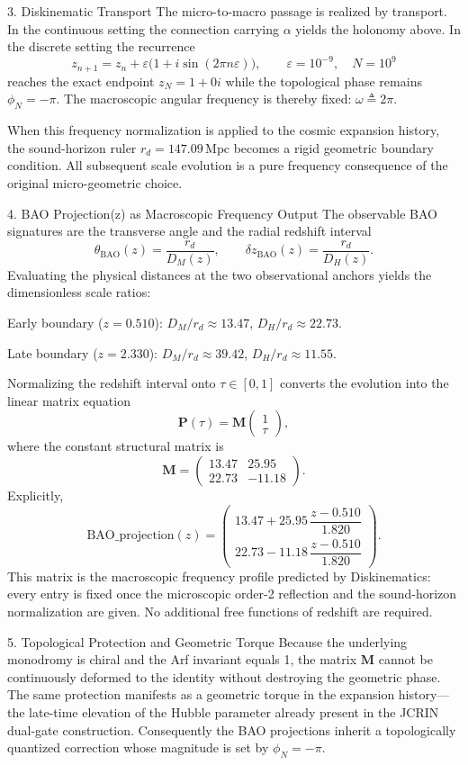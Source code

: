 3. Diskinematic Transport
The micro-to-macro passage is realized by transport. In the continuous setting the connection carrying \(\alpha\) yields the holonomy above. In the discrete setting the recurrence  
\[
z_{n+1}=z_n+\varepsilon\bigl(1+i\sin(2\pi n\varepsilon)\bigr),\qquad\varepsilon=10^{-9},\quad N=10^9
\]  
reaches the exact endpoint \(z_N=1+0i\) while the topological phase remains \(\phi_N=-\pi\). The macroscopic angular frequency is thereby fixed: \(\omega\triangleq2\pi\).

When this frequency normalization is applied to the cosmic expansion history, the sound-horizon ruler \(r_d=147.09\,\mathrm{Mpc}\) becomes a rigid geometric boundary condition. All subsequent scale evolution is a pure frequency consequence of the original micro-geometric choice.

4. BAO Projection(z) as Macroscopic Frequency Output
The observable BAO signatures are the transverse angle and the radial redshift interval  
\[
\theta_{\mathrm{BAO}}(z)=\frac{r_d}{D_M(z)},\qquad\delta z_{\mathrm{BAO}}(z)=\frac{r_d}{D_H(z)}.
\]  
Evaluating the physical distances at the two observational anchors yields the dimensionless scale ratios:

Early boundary (\(z=0.510\)):  
  \(D_M/r_d\approx13.47\), \(D_H/r_d\approx22.73\).

Late boundary (\(z=2.330\)):  
  \(D_M/r_d\approx39.42\), \(D_H/r_d\approx11.55\).

Normalizing the redshift interval onto \(\tau\in[0,1]\) converts the evolution into the linear matrix equation  
\[
\mathbf{P}(\tau)=\mathbf{M}\begin{pmatrix}1\\\tau\end{pmatrix},
\]  
where the constant structural matrix is  
\[
\mathbf{M}=\begin{pmatrix}13.47&25.95\\22.73&-11.18\end{pmatrix}.
\]  
Explicitly,  
\[
\mathrm{BAO\_projection}(z)=\begin{pmatrix}
13.47+25.95\,\dfrac{z-0.510}{1.820}\\
22.73-11.18\,\dfrac{z-0.510}{1.820}
\end{pmatrix}.
\]  
This matrix is the macroscopic frequency profile predicted by Diskinematics: every entry is fixed once the microscopic order-2 reflection and the sound-horizon normalization are given. No additional free functions of redshift are required.

5. Topological Protection and Geometric Torque
Because the underlying monodromy is chiral and the Arf invariant equals 1, the matrix \(\mathbf{M}\) cannot be continuously deformed to the identity without destroying the geometric phase. The same protection manifests as a geometric torque in the expansion history—the late-time elevation of the Hubble parameter already present in the JCRIN dual-gate construction. Consequently the BAO projections inherit a topologically quantized correction whose magnitude is set by \(\phi_N=-\pi\).


